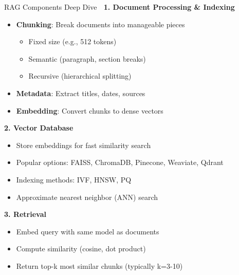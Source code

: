 \documentclass[aspectratio=169]{beamer}
\begin{document}
\begin{frame}[shrink=10]{RAG Components Deep Dive 🔬}
\textbf{1. Document Processing \& Indexing}
\begin{itemize}\setlength{\itemsep}{0pt}
    \item \textbf{Chunking}: Break documents into manageable pieces
    \begin{itemize}\setlength{\itemsep}{0pt}
        \item Fixed size (e.g., 512 tokens)
        \item Semantic (paragraph, section breaks)
        \item Recursive (hierarchical splitting)
    \end{itemize}
    \item \textbf{Metadata}: Extract titles, dates, sources
    \item \textbf{Embedding}: Convert chunks to dense vectors
\end{itemize}

\vspace{0.5em}

\textbf{2. Vector Database}
\begin{itemize}\setlength{\itemsep}{0pt}
    \item Store embeddings for fast similarity search
    \item Popular options: FAISS, ChromaDB, Pinecone, Weaviate, Qdrant
    \item Indexing methods: IVF, HNSW, PQ
    \item Approximate nearest neighbor (ANN) search
\end{itemize}

\vspace{0.5em}

\textbf{3. Retrieval}
\begin{itemize}\setlength{\itemsep}{0pt}
    \item Embed query with same model as documents
    \item Compute similarity (cosine, dot product)
    \item Return top-k most similar chunks (typically k=3-10)
\end{itemize}
\end{frame}
\end{document}
